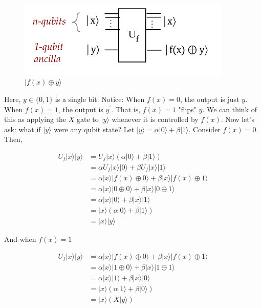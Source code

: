 \documentclass[main.tex]{subfiles}
\begin{document}
    \begin{figure}
        \centering
        \includegraphics[width=4in]{notes/figs/n11/15deutsch7.png}
            \caption{$|f(x) \oplus y\rangle$}
        \label{fig:15deutsch7}
    \end{figure}
    
    Here, $y \in\{0,1\}$ is a single bit. Notice: When $f(x)=0$, the output is just $y$. When $f(x)=1$, the output is $y^{\prime}$. That is, $f(x)=1$ "flips" $y$. We can think of this as applying the $X$ gate to $|y\rangle$ whenever it is controlled by $f(x)$. Now let's ask: what if $|y\rangle$ were any qubit state? Let $|y\rangle=\alpha|0\rangle+\beta|1\rangle$. Consider $f(x)=0$. Then,
    
    $$
    \begin{aligned}
    U_{f}|x\rangle|y\rangle &=U_{f}|x\rangle(\alpha|0\rangle+\beta|1\rangle) \\
    &=\alpha U_{f}|x\rangle|0\rangle+\beta U_{f}|x\rangle|1\rangle \\
    &=\alpha|x\rangle|f(x) \oplus 0\rangle+\beta|x\rangle|f(x) \oplus 1\rangle \\
    &=\alpha|x\rangle|0 \oplus 0\rangle+\beta|x\rangle|0 \oplus 1\rangle \\
    &=\alpha|x\rangle|0\rangle+\beta|x\rangle|1\rangle \\
    &=|x\rangle(\alpha|0\rangle+\beta|1\rangle) \\
    &=|x\rangle|y\rangle
    \end{aligned}
    $$
    
    And when $f(x)=1$
    
    $$
    \begin{aligned}
    U_{f}|x\rangle|y\rangle &=\alpha|x\rangle|f(x) \oplus 0\rangle+\beta|x\rangle|f(x) \oplus 1\rangle \\
    &=\alpha|x\rangle|1 \oplus 0\rangle+\beta|x\rangle|1 \oplus 1\rangle \\
    &=\alpha|x\rangle|1\rangle+\beta|x\rangle|0\rangle \\
    &=|x\rangle(\alpha|1\rangle+\beta|0\rangle) \\
    &=|x\rangle(X|y\rangle)
    \end{aligned}
    $$
    
\end{document}
